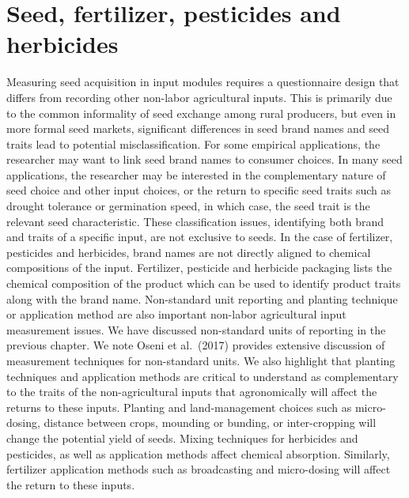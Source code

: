 \documentclass[
]{book}
\begin{document}
\hypertarget{seed-fertilizer-pesticides-and-herbicides}{%
\section{Seed, fertilizer, pesticides and herbicides}\label{seed-fertilizer-pesticides-and-herbicides}}

Measuring seed acquisition in input modules requires a questionnaire design that differs from recording other non-labor agricultural inputs. This is primarily due to the common informality of seed exchange among rural producers, but even in more formal seed markets, significant differences in seed brand names and seed traits lead to potential misclassification. For some empirical applications, the researcher may want to link seed brand names to consumer choices. In many seed applications, the researcher may be interested in the complementary nature of seed choice and other input choices, or the return to specific seed traits such as drought tolerance or germination speed, in which case, the seed trait is the relevant seed characteristic. These classification issues, identifying both brand and traits of a specific input, are not exclusive to seeds. In the case of fertilizer, pesticides and herbicides, brand names are not directly aligned to chemical compositions of the input. Fertilizer, pesticide and herbicide packaging lists the chemical composition of the product which can be used to identify product traits along with the brand name. Non-standard unit reporting and planting technique or application method are also important non-labor agricultural input measurement issues. We have discussed non-standard units of reporting in the previous chapter. We note Oseni et al.~(2017) provides extensive discussion of measurement techniques for non-standard units. We also highlight that planting techniques and application methods are critical to understand as complementary to the traits of the non-agricultural inputs that agronomically will affect the returns to these inputs. Planting and land-management choices such as micro-dosing, distance between crops, mounding or bunding, or inter-cropping will change the potential yield of seeds. Mixing techniques for herbicides and pesticides, as well as application methods affect chemical absorption. Similarly, fertilizer application methods such as broadcasting and micro-dosing will affect the return to these inputs.
\end{document}

